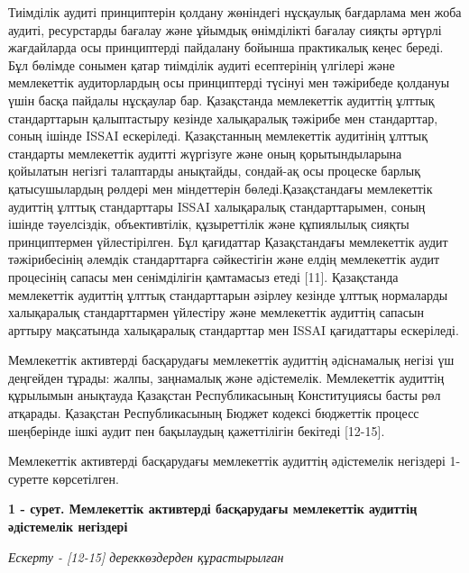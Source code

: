 \begin{multicols}{2}
Тиімділік аудиті принциптерін қолдану жөніндегі нұсқаулық бағдарлама мен
жоба аудиті, ресурстарды бағалау және ұйымдық өнімділікті бағалау сияқты
әртүрлі жағдайларда осы принциптерді пайдалану бойынша практикалық кеңес
береді. Бұл бөлімде сонымен қатар тиімділік аудиті есептерінің үлгілері
және мемлекеттік аудиторлардың осы принциптерді түсінуі мен тәжірибеде
қолдануы үшін басқа пайдалы нұсқаулар бар. Қазақстанда мемлекеттік
аудиттің ұлттық стандарттарын қалыптастыру кезінде халықаралық тәжірибе
мен стандарттар, соның ішінде ISSAI ескеріледі. Қазақстанның мемлекеттік
аудитінің ұлттық стандарты мемлекеттік аудитті жүргізуге және оның
қорытындыларына қойылатын негізгі талаптарды анықтайды, сондай-ақ осы
процеске барлық қатысушылардың рөлдері мен міндеттерін
бөледі.Қазақстандағы мемлекеттік аудиттің ұлттық стандарттары ISSAI
халықаралық стандарттарымен, соның ішінде тәуелсіздік, объективтілік,
құзыреттілік және құпиялылық сияқты принциптермен үйлестірілген. Бұл
қағидаттар Қазақстандағы мемлекеттік аудит тәжірибесінің әлемдік
стандарттарға сәйкестігін және елдің мемлекеттік аудит процесінің сапасы
мен сенімділігін қамтамасыз етеді {[}11{]}. Қазақстанда мемлекеттік
аудиттің ұлттық стандарттарын әзірлеу кезінде ұлттық нормаларды
халықаралық стандарттармен үйлестіру және мемлекеттік аудиттің сапасын
арттыру мақсатында халықаралық стандарттар мен ISSAI қағидаттары
ескеріледі.

Мемлекеттік активтерді басқарудағы мемлекеттік аудиттің әдіснамалық
негізі үш деңгейден тұрады: жалпы, заңнамалық және әдістемелік.
Мемлекеттік аудиттің құрылымын анықтауда Қазақстан Республикасының
Конституциясы басты рөл атқарады. Қазақстан Республикасының Бюджет
кодексі бюджеттік процесс шеңберінде ішкі аудит пен бақылаудың
қажеттілігін бекітеді {[}12-15{]}.

Мемлекеттік активтерді басқарудағы мемлекеттік аудиттің әдістемелік
негіздері 1-суретте көрсетілген.
\end{multicols}

{\bfseries 1 - сурет. Мемлекеттік активтерді басқарудағы мемлекеттік аудиттің әдістемелік негіздері}

\emph{Ескерту - {[}12-15{]} дереккөздерден құрастырылған}

